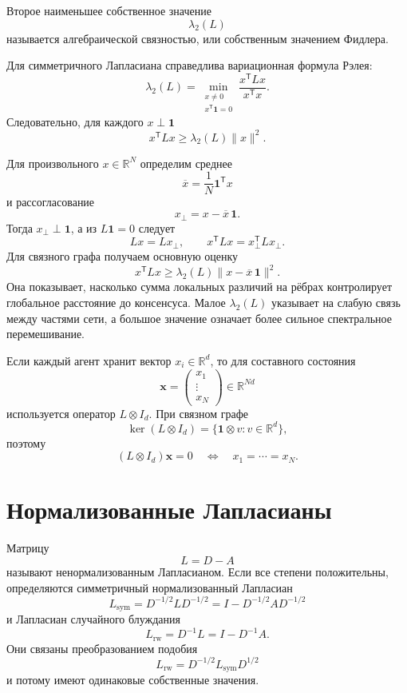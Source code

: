 \begin{definition}
Второе наименьшее собственное значение
\[
    \lambda_2(L)
\]
называется алгебраической связностью, или собственным значением
Фидлера.
\end{definition}

Для симметричного Лапласиана справедлива вариационная формула Рэлея:
\[
    \lambda_2(L)
    =
    \min_{\substack{x\ne0\\x^{\mathsf T}\mathbf1=0}}
    \frac{x^{\mathsf T}Lx}{x^{\mathsf T}x}.
\]
Следовательно, для каждого \(x\perp\mathbf1\)
\[
    x^{\mathsf T}Lx
    \ge
    \lambda_2(L)\lVert x\rVert^2.
\]

Для произвольного \(x\in\mathbb R^N\) определим среднее
\[
    \overline x
    =
    \frac1N\mathbf1^{\mathsf T}x
\]
и рассогласование
\[
    x_\perp=x-\overline x\,\mathbf1.
\]
Тогда \(x_\perp\perp\mathbf1\), а из \(L\mathbf1=0\) следует
\[
    Lx=Lx_\perp,
    \qquad
    x^{\mathsf T}Lx
    =
    x_\perp^{\mathsf T}Lx_\perp.
\]
Для связного графа получаем основную оценку
\[
    x^{\mathsf T}Lx
    \ge
    \lambda_2(L)
    \lVert
        x-\overline x\,\mathbf1
    \rVert^2.
\]
Она показывает, насколько сумма локальных различий на рёбрах
контролирует глобальное расстояние до консенсуса. Малое
\(\lambda_2(L)\) указывает на слабую связь между частями сети, а
большое значение означает более сильное спектральное перемешивание.

Если каждый агент хранит вектор \(x_i\in\mathbb R^d\), то для
составного состояния
\[
    \mathbf x=
    \begin{pmatrix}
        x_1\\
        \vdots\\
        x_N
    \end{pmatrix}
    \in\mathbb R^{Nd}
\]
используется оператор \(L\otimes I_d\). При связном графе
\[
    \ker(L\otimes I_d)
    =
    \{
        \mathbf1\otimes v:
        v\in\mathbb R^d
    \},
\]
поэтому
\[
    (L\otimes I_d)\mathbf x=0
    \quad\Longleftrightarrow\quad
    x_1=\cdots=x_N.
\]

\section{Нормализованные Лапласианы}

Матрицу
\[
    L=D-A
\]
называют ненормализованным Лапласианом. Если все степени положительны,
определяются симметричный нормализованный Лапласиан
\[
    L_{\mathrm{sym}}
    =
    D^{-1/2}LD^{-1/2}
    =
    I-D^{-1/2}AD^{-1/2}
\]
и Лапласиан случайного блуждания
\[
    L_{\mathrm{rw}}
    =
    D^{-1}L
    =
    I-D^{-1}A.
\]
Они связаны преобразованием подобия
\[
    L_{\mathrm{rw}}
    =
    D^{-1/2}
    L_{\mathrm{sym}}
    D^{1/2}
\]
и потому имеют одинаковые собственные значения.

